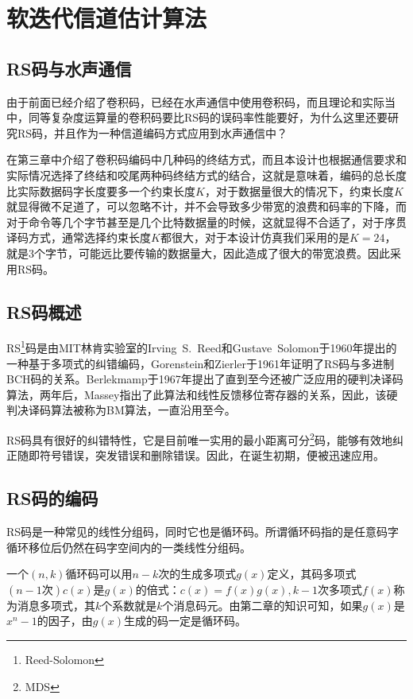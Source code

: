 %
\chapter{软迭代信道估计算法}
\thispagestyle{empty}
\section{RS码与水声通信}
由于前面已经介绍了卷积码，已经在水声通信中使用卷积码，而且理论和实际当中，同等复杂度运算量的卷积码要比RS码的误码率性能要好，为什么这里还要研究RS码，并且作为一种信道编码方式应用到水声通信中？

在第三章中介绍了卷积码编码中几种码的终结方式，而且本设计也根据通信要求和实际情况选择了终结和咬尾两种码终结方式的结合，这就是意味着，编码的总长度比实际数据码字长度要多一个约束长度$K$，对于数据量很大的情况下，约束长度$K$就显得微不足道了，可以忽略不计，并不会导致多少带宽的浪费和码率的下降，而对于命令等几个字节甚至是几个比特数据量的时候，这就显得不合适了，对于序贯译码方式，通常选择约束长度$K$都很大，对于本设计仿真我们采用的是$K=24$，就是3个字节，可能远比要传输的数据量大，因此造成了很大的带宽浪费。因此采用RS码。

\section{RS码概述}
RS\footnote{Reed-Solomon}码是由MIT林肯实验室的Irving~S.~Reed和Gustave~Solomon\cite{Reed_RS}于1960年提出的一种基于多项式的纠错编码，Gorenstein和Zierler于1961年证明了RS码与多进制BCH码的关系。Berlekmamp于1967年提出了直到至今还被广泛应用的硬判决译码算法，两年后，Massey指出了此算法和线性反馈移位寄存器的关系，因此，该硬判决译码算法被称为BM算法，一直沿用至今。

RS码具有很好的纠错特性，它是目前唯一实用的最小距离可分\footnote{MDS}码，能够有效地纠正随即符号错误，突发错误和删除错误。因此，在诞生初期，便被迅速应用。
\section{RS码的编码}
RS码是一种常见的线性分组码，同时它也是循环码。所谓循环码指的是任意码字循环移位后仍然在码字空间内的一类线性分组码\cite{Coding_Fundation}。

一个$(n,k)$循环码可以用$n-k$次的生成多项式$g(x)$定义，其码多项式$(n-1\mbox{次})c(x)$是$g(x)$的倍式：$c(x)=f(x)g(x),k-1$次多项式$f(x)$称为消息多项式，其$k$个系数就是$k$个消息码元。由第二章的知识可知，如果$g(x)$是$x^n-1$的因子，由$g(x)$生成的码一定是循环码。

